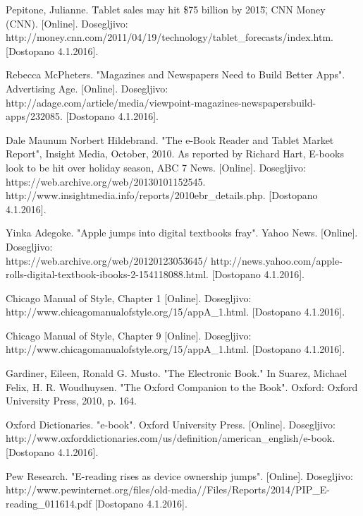 \documentclass[a4paper, 12pt]{book}
\begin{document}
\begin{thebibliography}{99}
 Pepitone, Julianne. \"Tablet sales may hit \$75 billion by 2015\", CNN Money (CNN). 
[Online]. Dosegljivo:\\ http://money.cnn.com/2011/04/19/technology/tablet\_forecasts/index.htm.
[Dostopano 4.1.2016].

 Rebecca McPheters. "Magazines and Newspapers Need to Build Better Apps". Advertising Age.
[Online]. Dosegljivo:\\ http://adage.com/article/media/viewpoint-magazines-newspapers\-build-apps/232085.
[Dostopano 4.1.2016].

 Dale Maunum Norbert Hildebrand. "The e-Book Reader and Tablet Market Report", Insight Media, October, 2010. As reported by Richard Hart, E-books look to be hit over holiday season, ABC 7 News.
[Online]. Dosegljivo:\\ https://web.archive.org/web/20130101152545. http://www.insightmedia.info/reports/2010ebr\_details.php.
[Dostopano 4.1.2016].

 Yinka Adegoke. "Apple jumps into digital textbooks fray". Yahoo News.
[Online]. Dosegljivo:\\ https://web.archive.org/web/20120123053645/
http://news.yahoo.com/apple-rolls-digital-textbook-ibooks-2-154118088.html.
[Dostopano 4.1.2016].
 
 Chicago Manual of Style, Chapter 1
[Online]. Dosegljivo:\\ http://www.chicagomanualofstyle.org/15/appA\_1.html.
[Dostopano 4.1.2016].
 
 Chicago Manual of Style, Chapter 9
[Online]. Dosegljivo:\\ http://www.chicagomanualofstyle.org/15/appA\_1.html.
[Dostopano 4.1.2016].

 Gardiner, Eileen, Ronald G. Musto. "The Electronic Book." In Suarez, Michael Felix, H. R. Woudhuysen. "The Oxford Companion to the Book". Oxford: Oxford University Press, 2010, p. 164.

 Oxford Dictionaries. "e-book".  Oxford University Press. 
[Online]. Dosegljivo:\\ http://www.oxforddictionaries.com/us/definition/american\_english/e-book.
[Dostopano 4.1.2016].

 Pew Research. "E-reading rises as device ownership jumps". 
[Online]. Dosegljivo:\\ http://www.pewinternet.org/files/old-media//Files/Reports/2014/PIP\_E-reading\_011614.pdf
[Dostopano 4.1.2016]. 


\end{thebibliography}
\end{document}
